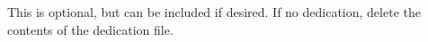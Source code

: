 \begin{dedication}
    This is optional, but can be included if desired.
    If no dedication, delete the contents of the dedication file.
\end{dedication}
